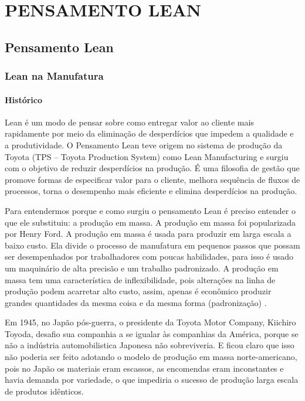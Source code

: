 \part{PENSAMENTO LEAN}

\chapter[Pensamento Lean]{Pensamento Lean}



\section[Lean na Manufatura]{Lean na Manufatura}

\subsection[Histórico]{Histórico}

Lean é um modo de pensar sobre como entregar valor ao cliente mais rapidamente por meio da eliminação de desperdícios que impedem a qualidade e a produtividade. O Pensamento Lean teve origem no sistema de produção da Toyota (TPS – Toyota Production System) como Lean Manufacturing e surgiu com o objetivo de reduzir desperdícios na produção. É uma filosofia de gestão que promove formas de especificar valor para o cliente, melhora sequência de fluxos de processos, torna o desempenho mais eficiente e elimina desperdícios na produção. 

Para entendermos porque e como surgiu o pensamento Lean é preciso entender o que ele substituiu: a produção em massa.  A produção em massa foi popularizada por Henry Ford. A produção em massa é usada para produzir em larga escala a baixo custo. Ela divide o processo de manufatura em pequenos passos que possam ser desempenhados por trabalhadores com poucas habilidades, para isso é usado um maquinário de alta precisão e um trabalho padronizado. A produção em massa tem uma característica de inflexibilidade, pois alterações na linha de produção podem acarretar alto custo, assim, apenas é econômico produzir grandes quantidades da mesma coisa e da mesma forma (padronização) \cite{hibbs2009}. 

Em 1945, no Japão pós-guerra, o presidente da Toyota Motor Company, Kiichiro Toyoda, desafio sua companhia a se igualar às companhias da América, porque se não a indústria automobilistica Japonesa não sobreviveria. E ficou claro que isso não poderia ser feito adotando o modelo de produção em massa norte-americano, pois no Japão os materiais eram escassos, as encomendas eram inconstantes e havia demanda por variedade, o que impediria o sucesso de produção larga escala de produtos idênticos. 

